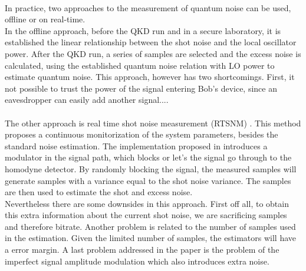 \\
In practice, two approaches to the measurement of quantum noise can be used, offline or on real-time.\\
In the offline approach, before the QKD run and in a secure laboratory, it is established the linear relationship between the shot noise and the local oscillator power.
After the QKD run, a series of samples are selected and the excess noise is calculated, using the established quantum noise relation with LO power to estimate quantum noise.
This approach, however has two shortcomings. First, it not possible to trust the power of the signal entering Bob's device, since an eavesdropper can easily add another signal....\\
\\
The other approach is real time shot noise measurement (RTSNM)
\cite{wang2018practical, kunz2015robust}.
This method proposes a continuous monitorization of the system parameters, besides the standard noise estimation. The implementation proposed in
\cite{wang2018practical}
introduces a modulator in the signal path, which blocks or let's the signal go through to the homodyne detector. By randomly blocking the signal, the measured samples will generate samples with a variance equal to the shot noise variance. The samples are then used to estimate the shot and excess noise.\\
Nevertheless there are some downsides in this approach. First off all, to obtain this extra information about the current shot noise, we are sacrificing samples and therefore bitrate. Another problem is related to the number of samples used in the estimation. Given the limited number of samples, the estimators will have a error margin. A last problem addressed in the paper is the problem of the imperfect signal amplitude modulation which also introduces extra noise.\\
%
%
%
%
%
%


\renewcommand{\bibname}{References}
%


%
%


\cleardoublepage
